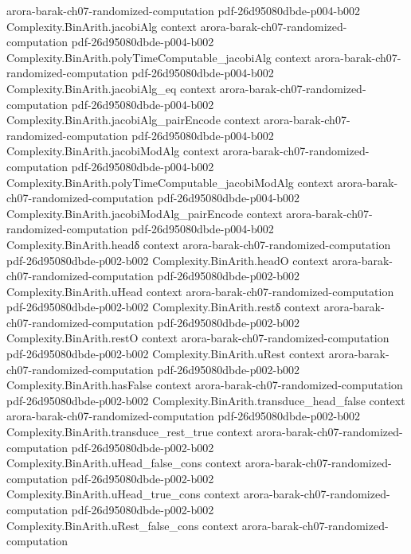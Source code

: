 \begin{theorem}
  {arora-barak-ch07-randomized-computation}
  {pdf-26d95080dbde-p004-b002}
\proofstep
  {Complexity.BinArith.jacobiAlg}
  {context}
  {arora-barak-ch07-randomized-computation}
  {pdf-26d95080dbde-p004-b002}
\proofstep
  {Complexity.BinArith.polyTimeComputable_jacobiAlg}
  {context}
  {arora-barak-ch07-randomized-computation}
  {pdf-26d95080dbde-p004-b002}
\proofstep
  {Complexity.BinArith.jacobiAlg_eq}
  {context}
  {arora-barak-ch07-randomized-computation}
  {pdf-26d95080dbde-p004-b002}
\proofstep
  {Complexity.BinArith.jacobiAlg_pairEncode}
  {context}
  {arora-barak-ch07-randomized-computation}
  {pdf-26d95080dbde-p004-b002}
\proofstep
  {Complexity.BinArith.jacobiModAlg}
  {context}
  {arora-barak-ch07-randomized-computation}
  {pdf-26d95080dbde-p004-b002}
\proofstep
  {Complexity.BinArith.polyTimeComputable_jacobiModAlg}
  {context}
  {arora-barak-ch07-randomized-computation}
  {pdf-26d95080dbde-p004-b002}
\proofstep
  {Complexity.BinArith.jacobiModAlg_pairEncode}
  {context}
  {arora-barak-ch07-randomized-computation}
  {pdf-26d95080dbde-p004-b002}
\proofstep
  {Complexity.BinArith.headδ}
  {context}
  {arora-barak-ch07-randomized-computation}
  {pdf-26d95080dbde-p002-b002}
\proofstep
  {Complexity.BinArith.headO}
  {context}
  {arora-barak-ch07-randomized-computation}
  {pdf-26d95080dbde-p002-b002}
\proofstep
  {Complexity.BinArith.uHead}
  {context}
  {arora-barak-ch07-randomized-computation}
  {pdf-26d95080dbde-p002-b002}
\proofstep
  {Complexity.BinArith.restδ}
  {context}
  {arora-barak-ch07-randomized-computation}
  {pdf-26d95080dbde-p002-b002}
\proofstep
  {Complexity.BinArith.restO}
  {context}
  {arora-barak-ch07-randomized-computation}
  {pdf-26d95080dbde-p002-b002}
\proofstep
  {Complexity.BinArith.uRest}
  {context}
  {arora-barak-ch07-randomized-computation}
  {pdf-26d95080dbde-p002-b002}
\proofstep
  {Complexity.BinArith.hasFalse}
  {context}
  {arora-barak-ch07-randomized-computation}
  {pdf-26d95080dbde-p002-b002}
\proofstep
  {Complexity.BinArith.transduce_head_false}
  {context}
  {arora-barak-ch07-randomized-computation}
  {pdf-26d95080dbde-p002-b002}
\proofstep
  {Complexity.BinArith.transduce_rest_true}
  {context}
  {arora-barak-ch07-randomized-computation}
  {pdf-26d95080dbde-p002-b002}
\proofstep
  {Complexity.BinArith.uHead_false_cons}
  {context}
  {arora-barak-ch07-randomized-computation}
  {pdf-26d95080dbde-p002-b002}
\proofstep
  {Complexity.BinArith.uHead_true_cons}
  {context}
  {arora-barak-ch07-randomized-computation}
  {pdf-26d95080dbde-p002-b002}
\proofstep
  {Complexity.BinArith.uRest_false_cons}
  {context}
  {arora-barak-ch07-randomized-computation}

\end{theorem}
